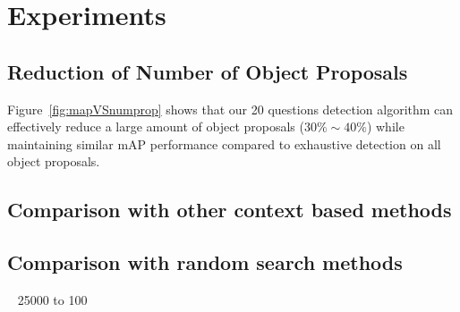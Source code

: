 \section{Experiments}

\subsection{Reduction of Number of Object Proposals}

Figure~\ref{fig:mapVSnumprop} shows that our 20 questions detection algorithm can effectively reduce a large amount of object proposals ($30\% \sim 40\%$) while maintaining similar mAP performance compared to exhaustive detection on all object proposals.  

\subsection{Comparison with other context based methods}

\subsection{Comparison with random search methods}


~\cite{bogdan2012context} 25000 to 100 